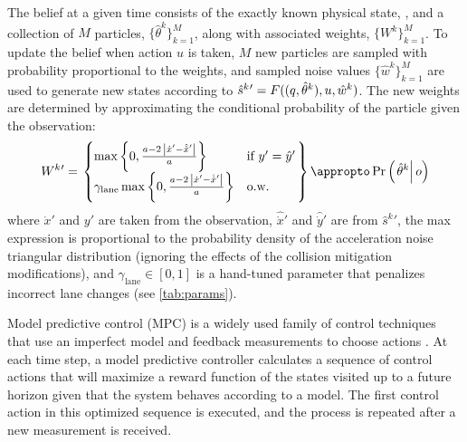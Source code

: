 The belief at a given time consists of the exactly known physical state, \phys, and a collection of $M$ particles, $\{\hat{\theta}^k\}_{k=1}^M$, along with associated weights, $\{W^k\}_{k=1}^M$.
To update the belief when action $u$ is taken, $M$ new particles are sampled with probability proportional to the weights, and sampled noise values $\{\hat{w}^k\}_{k=1}^M$ are used to generate new states according to ${\hat{s}^k}{'} = F((q, \hat{\theta}^k), u, \hat{w}^k)$.
The new weights are determined by approximating the conditional probability of the particle given the observation:
\begin{equation*}
{W^k}{'} = \left.
\begin{cases}
    \max\left\{0, \frac{a - 2 \, \left| \dot{x}' - \hat{\dot{x}}' \right|}{a} \right\} & \text{if } y' = \hat{y}' \\
\gamma_\text{lane} \max\left\{0, \frac{a - 2 \, \left| \dot{x}' - \hat{\dot{x}}' \right|}{a} \right\} & \text{o.w.}
\end{cases} \right\} \appropto \operatorname{Pr}\left(\left.\hat{\theta}^k \right| o \right)
\end{equation*}
where $\dot{x}'$ and $y'$ are taken from the observation, $\hat{\dot{x}}'$ and $\hat{\dot{y}}'$ are from ${\hat{s}^k}{'}$, the max expression is proportional to the probability density of the acceleration noise triangular distribution (ignoring the effects of the collision mitigation modifications), and $\gamma_\text{lane} \in [0,1]$ is a hand-tuned parameter that penalizes incorrect lane changes (see \cref{tab:params}).


Model predictive control (MPC) is a widely used family of control techniques that use an imperfect model and feedback measurements to choose actions \cite{garcia1989model}. At each time step, a model predictive controller calculates a sequence of control actions that will maximize a reward function of the states visited up to a future horizon given that the system behaves according to a model. The first control action in this optimized sequence is executed, and the process is repeated after a new measurement is received.


